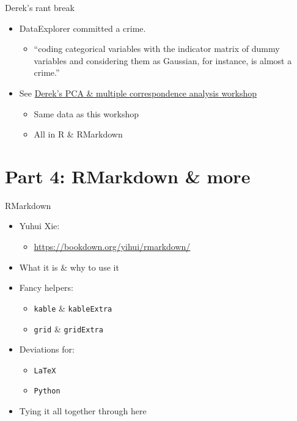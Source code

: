 \documentclass[
  ignorenonframetext,
]{beamer}
\providecommand{\tightlist}{%
  \setlength{\itemsep}{0pt}\setlength{\parskip}{0pt}}
\begin{document}
\begin{frame}{Derek's rant break}
\protect\hypertarget{dereks-rant-break}{}

\begin{itemize}
\tightlist
\item
  DataExplorer committed a crime.

  \begin{itemize}
  \tightlist
  \item
    ``coding categorical variables with the indicator matrix of dummy
    variables and considering them as Gaussian, for instance, is almost
    a crime.''
  \end{itemize}
\item
  See
  \href{https://github.com/derekbeaton/Workshops/tree/master/RTC/PCA_MCA_Resampling/}{Derek's
  PCA \& multiple correspondence analysis workshop}

  \begin{itemize}
  \tightlist
  \item
    Same data as this workshop
  \item
    All in R \& RMarkdown
  \end{itemize}
\end{itemize}

\end{frame}

\hypertarget{part-4-rmarkdown-more}{%
\section{Part 4: RMarkdown \& more}\label{part-4-rmarkdown-more}}

\begin{frame}[fragile]{RMarkdown}
\protect\hypertarget{rmarkdown}{}

\begin{itemize}
\tightlist
\item
  Yuhui Xie:

  \begin{itemize}
  \tightlist
  \item
    \url{https://bookdown.org/yihui/rmarkdown/}
  \end{itemize}
\item
  What it is \& why to use it
\item
  Fancy helpers:

  \begin{itemize}
  \tightlist
  \item
    \texttt{kable} \& \texttt{kableExtra}
  \item
    \texttt{grid} \& \texttt{gridExtra}
  \end{itemize}
\item
  Deviations for:

  \begin{itemize}
  \tightlist
  \item
    \texttt{LaTeX}
  \item
    \texttt{Python}
  \end{itemize}
\item
  Tying it all together through here
\end{itemize}

\end{frame}
\end{document}

